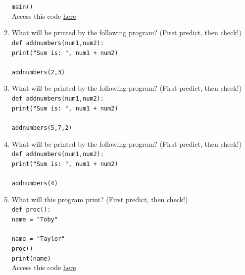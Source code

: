 \documentclass{article}
\begin{document}
\begin{enumerate}
	\texttt{main()}\\
		Access this code \href{https://drive.google.com/file/d/1MGlbId_BLjoFRdNz8qp-OS1lGKVOViBQ/view?usp=sharing}{here}
	\item What will be printed by the following program? (First predict, then check!)\\
	\texttt{def addnumbers(num1,num2):}\\
	\null\quad\texttt{print("Sum is: ", num1 + num2)}\\
	\texttt{}\\
	\texttt{addnumbers(2,3)}\\
	\item What will be printed by the following program? (First predict, then check!)\\
	\texttt{def addnumbers(num1,num2):}\\
	\null\quad\texttt{print("Sum is: ", num1 + num2)}\\
	\texttt{}\\
	\texttt{addnumbers(5,7,2)}\\
	\item What will be printed by the following program? (First predict, then check!)\\
	\texttt{def addnumbers(num1,num2):}\\
	\null\quad\texttt{print("Sum is: ", num1 + num2)}\\
	\texttt{}\\
	\texttt{addnumbers(4)}\\
	\item What will this program print? (First predict, then check!)\\
	\texttt{def proc():}\\
	\null\quad\texttt{name = "Toby"}\\
	\texttt{}\\
	\texttt{name = "Taylor"}\\
	\texttt{proc()}\\
	\texttt{print(name)}\\
	Access this code \href{https://drive.google.com/file/d/1C2JdkQ23hZkatLRrj7PbGVye3sl6ZVFJ/view?usp=sharing}{here}
\end{enumerate}
\end{document}
